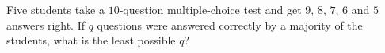 Five students take a $10$-question multiple-choice test and get $9$, $8$, $7$, $6$ and $5$ answers right. If $q$ questions were answered correctly by a majority of the students, what is the least possible $q$?
